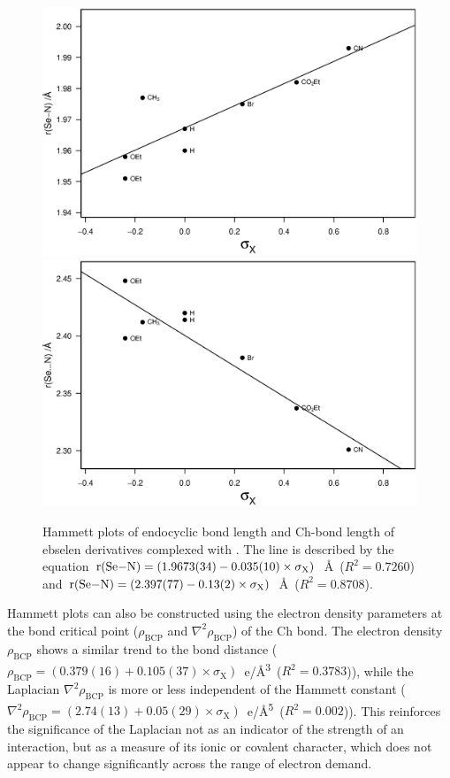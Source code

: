 \begin{refsection}
\begin{figure}
  \centering
  \includegraphics[width=0.9\linewidth]{Figures/hammett-endo-morph.eps}
  \includegraphics[width=0.9\linewidth]{Figures/hammett-morph.eps}
  \caption[Hammett plots of endocyclic  bond length and  Ch-bond length of ebselen derivatives complexed with .]{Hammett plots of endocyclic  bond length and  Ch-bond length of ebselen derivatives complexed with . The line is described by the equation $\mathrm{r}(\ce{Se-N}) = (1.9673(34) - 0.035(10) \times \sigma_{\mathrm{X}})$~\AA~($R^2=0.7260$) and $\mathrm{r}(\ce{Se-N}) = (2.397(77) - 0.13(2) \times \sigma_{\mathrm{X}})$~\AA~($R^2=0.8708$).}
  \label{fig:hammett-morph}
\end{figure}

Hammett plots can also be constructed using the electron density parameters at the bond critical point ($\rho_\text{BCP}$ and $\nabla^2\rho_{\text{BCP}}$) of the Ch bond.
The electron density $\rho_\text{BCP}$ shows a similar trend to the bond distance ($\rho_{\text{BCP}} = (0.379(16) + 0.105(37) \times \sigma_{\mathrm{X}})$~e/\AA\textsuperscript{3}~($R^2=0.3783$)), while the Laplacian $\nabla^2\rho_{\text{BCP}}$ is more or less independent of the Hammett constant ($\nabla^2\rho_{\text{BCP}} = (2.74(13) + 0.05(29) \times \sigma_{\mathrm{X}})$~e/\AA\textsuperscript{5}~($R^2=0.002$)).
This reinforces the significance of the Laplacian not as an indicator of the strength of an interaction, but as a measure of its ionic or covalent character, which does not appear to change significantly across the range of electron demand.


\end{refsection}

